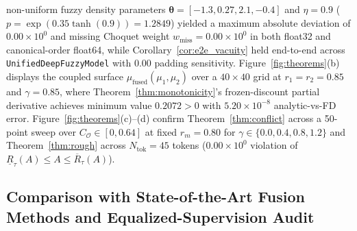 \documentclass[10pt,twocolumn]{article}
\begin{document}
non-uniform fuzzy density parameters $\bm{\theta}=[-1.3, 0.27, 2.1, -0.4]$ and $\eta = 0.9$
($p = \exp(0.35\tanh(0.9)) = 1.2849$) yielded a maximum absolute deviation of
$0.00 \times 10^0$ and missing Choquet weight $w_{\text{miss}} = 0.00 \times 10^0$ in both
float32 and canonical-order float64, while Corollary~\ref{cor:e2e_vacuity} held end-to-end
across \texttt{UnifiedDeepFuzzyModel} with $0.00$ padding sensitivity.
Figure~\ref{fig:theorems}(b) displays the coupled surface $\mu_{\text{fused}}(\mu_1, \mu_2)$
over a $40 \times 40$ grid at $r_1=r_2=0.85$ and $\gamma=0.85$, where
Theorem~\ref{thm:monotonicity}'s frozen-discount partial derivative achieves minimum value
$0.2072 > 0$ with $5.20 \times 10^{-8}$ analytic-vs-FD error.
Figure~\ref{fig:theorems}(c)--(d) confirm Theorem~\ref{thm:conflict} across a 50-point sweep
over $C_{\mathcal{O}} \in [0, 0.64]$ at fixed $r_m=0.80$ for $\gamma \in \{0.0, 0.4, 0.8,
1.2\}$ and Theorem~\ref{thm:rough} across $N_{\text{tok}}=45$ tokens ($0.00 \times 10^0$
violation of $\underline{R}_\tau(A) \le A \le \overline{R}_\tau(A)$).

\subsection{Comparison with State-of-the-Art Fusion Methods and Equalized-Supervision Audit}
\end{document}
